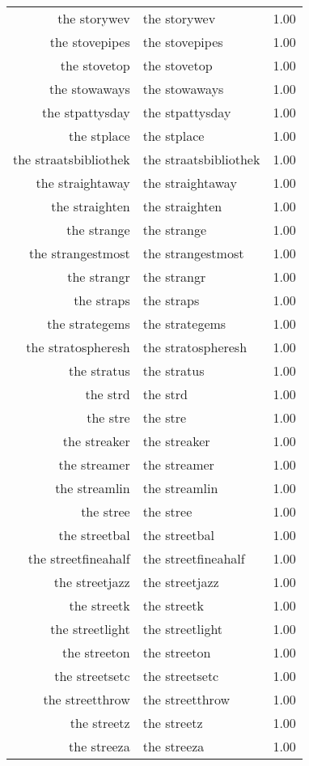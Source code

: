 \begin{table}[ht]
\begin{tabular}{rlr}
  the storywev & the storywev & 1.00 \\ 
  the stovepipes & the stovepipes & 1.00 \\ 
  the stovetop & the stovetop & 1.00 \\ 
  the stowaways & the stowaways & 1.00 \\ 
  the stpattysday & the stpattysday & 1.00 \\ 
  the stplace & the stplace & 1.00 \\ 
  the straatsbibliothek & the straatsbibliothek & 1.00 \\ 
  the straightaway & the straightaway & 1.00 \\ 
  the straighten & the straighten & 1.00 \\ 
  the strange & the strange & 1.00 \\ 
  the strangestmost & the strangestmost & 1.00 \\ 
  the strangr & the strangr & 1.00 \\ 
  the straps & the straps & 1.00 \\ 
  the strategems & the strategems & 1.00 \\ 
  the stratospheresh & the stratospheresh & 1.00 \\ 
  the stratus & the stratus & 1.00 \\ 
  the strd & the strd & 1.00 \\ 
  the stre & the stre & 1.00 \\ 
  the streaker & the streaker & 1.00 \\ 
  the streamer & the streamer & 1.00 \\ 
  the streamlin & the streamlin & 1.00 \\ 
  the stree & the stree & 1.00 \\ 
  the streetbal & the streetbal & 1.00 \\ 
  the streetfineahalf & the streetfineahalf & 1.00 \\ 
  the streetjazz & the streetjazz & 1.00 \\ 
  the streetk & the streetk & 1.00 \\ 
  the streetlight & the streetlight & 1.00 \\ 
  the streeton & the streeton & 1.00 \\ 
  the streetsetc & the streetsetc & 1.00 \\ 
  the streetthrow & the streetthrow & 1.00 \\ 
  the streetz & the streetz & 1.00 \\ 
  the streeza & the streeza & 1.00 \\ 

\end{tabular}
\end{table}
